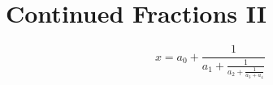 \chapter{Continued Fractions II}
\label{ap:confracII}

\lipsum[17]

\begin{equation*}
x = a_0 + \frac{1}{a_1 + \frac{1}{a_2 + \frac{1}{a_3 + a_4}}}
\end{equation*}